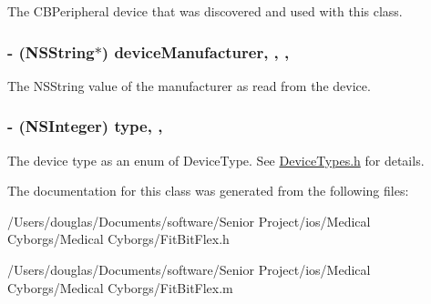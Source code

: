 The C\-B\-Peripheral device that was discovered and used with this class. \hypertarget{interface_fit_bit_flex_a3b4fca544836750998946aab4d4c8a3d}{
\subsubsection[{device\-Manufacturer}]{\setlength{\rightskip}{0pt plus 5cm}-\/ (N\-S\-String$\ast$) device\-Manufacturer\hspace{0.3cm}{\ttfamily [read]}, {\ttfamily [write]}, {\ttfamily [atomic]}, {\ttfamily [retain]}}}\label{interface_fit_bit_flex_a3b4fca544836750998946aab4d4c8a3d}
The N\-S\-String value of the manufacturer as read from the device. \hypertarget{interface_fit_bit_flex_a77895e42698dfb9e32ea3511dd68aa3e}{
\subsubsection[{type}]{\setlength{\rightskip}{0pt plus 5cm}-\/ (N\-S\-Integer) type\hspace{0.3cm}{\ttfamily [read]}, {\ttfamily [write]}, {\ttfamily [atomic]}}}\label{interface_fit_bit_flex_a77895e42698dfb9e32ea3511dd68aa3e}
The device type as an enum of Device\-Type. See \hyperlink{_device_types_8h_source}{Device\-Types.\-h} for details. 

The documentation for this class was generated from the following files\-:\begin{DoxyCompactItemize}
\item 
/\-Users/douglas/\-Documents/software/\-Senior Project/ios/\-Medical Cyborgs/\-Medical Cyborgs/Fit\-Bit\-Flex.\-h\item 
/\-Users/douglas/\-Documents/software/\-Senior Project/ios/\-Medical Cyborgs/\-Medical Cyborgs/Fit\-Bit\-Flex.\-m\end{DoxyCompactItemize}

